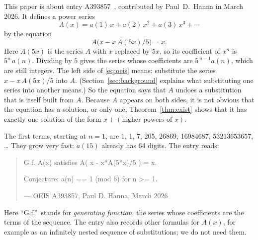 \documentclass[11pt,a4paper]{article}
\theoremstyle{definition}
\theoremstyle{remark}
\begin{document}
This paper is about entry A393857~\cite{oeis}, contributed by Paul~D.~Hanna in March 2026. It defines a power series
\[
A(x)=a(1)\,x+a(2)\,x^2+a(3)\,x^3+\cdots
\]
by the equation
\begin{equation}\label{eq:oeis}
A\bigl(x-x\,A(5x)/5\bigr)=x.
\end{equation}
Here $A(5x)$ is the series $A$ with $x$ replaced by $5x$, so its coefficient of $x^n$ is
$5^n\,a(n)$. Dividing by $5$ gives the series whose coefficients are
$5^{\,n-1}a(n)$, which are still integers. The left side of \eqref{eq:oeis} means: substitute the series
$x-x\,A(5x)/5$ into $A$. (Section~\ref{sec:background} explains what substituting one
series into another means.) So the equation says that $A$ undoes a substitution that is itself built from $A$. Because
$A$ appears on both sides, it is not obvious that the equation has a solution, or only one; Theorem~\ref{thm:exist}
shows that it has exactly one solution of the form $x+(\text{higher powers of }x)$.

The first terms, starting at $n=1$, are 1, 1, 7, 205, 26869, 16984687, 53213653657, \dots{} They grow very fast: $a(15)$
already has 64 digits. The entry reads:
\begin{quote}\small\ttfamily\raggedright G.f. A(x) satisfies A( x - x*A(5*x)/5 ) = x.\par\smallskip Conjecture: a(n) == 1 (mod 6) for n >= 1.\par\smallskip\hfill\textrm{--- OEIS A393857, Paul D. Hanna, March 2026}\end{quote}

Here ``G.f.''\ stands for \emph{generating function}, the series whose coefficients are the terms of the sequence.
The entry also records other formulas for $A(x)$, for example as an infinitely nested sequence of substitutions; we do
not need them.
\end{document}
